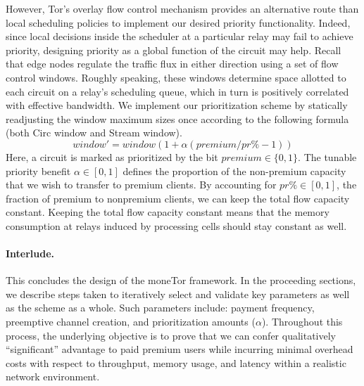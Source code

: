 However, Tor's overlay flow control mechanism provides an alternative route than local scheduling policies
to implement our desired priority functionality. Indeed, since local decisions inside the scheduler at a particular relay may fail to achieve priority, designing priority as a global function of the circuit may help. Recall that edge nodes regulate the
traffic flux in either direction using a set of flow control windows. Roughly
speaking, these windows determine space allotted to each circuit on a relay's
scheduling queue, which in turn is positively correlated with effective
bandwidth. We implement our prioritization scheme by statically readjusting the window maximum sizes once
according to the following formula (both Circ window and Stream window).
\begin{equation}
  window' = window(1+ \alpha(premium / pr\% - 1))
  \label{eq:flow}
\end{equation}
Here, a circuit is marked as prioritized by the bit
$premium \in \{0, 1\}$. The tunable priority benefit
$\alpha \in [0, 1]$ defines the proportion of the non-premium capacity that we wish
to transfer to premium clients. By accounting for
$pr\% \in [0,1]$, the fraction of premium to nonpremium clients, we
can keep the total flow capacity constant. Keeping the total flow capacity constant means that the memory consumption at relays induced by processing cells should stay constant as well.

\paragraph*{Interlude.} This concludes the design of the moneTor framework. In
the proceeding sections, we describe steps taken to iteratively select and
validate key parameters as well as the scheme as a whole. Such parameters
include: payment frequency, preemptive channel creation, and prioritization
amounts ($\alpha$). Throughout this process, the underlying objective is to
prove that we can confer qualitatively ``significant'' advantage to paid premium
users while incurring minimal overhead costs with respect to throughput, memory
usage, and latency within a realistic network environment.


